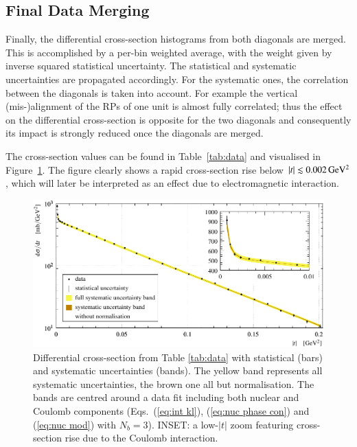 \subsection{Final Data Merging}
\label{sec:final data merging}

Finally, the differential cross-section histograms from both diagonals are merged. This is accomplished by a per-bin weighted average, with the weight given by inverse squared statistical uncertainty. The statistical and systematic uncertainties are propagated accordingly. For the systematic ones, the correlation between the diagonals is taken into account. For example the vertical (mis-)alignment of the RPs of one unit is almost fully correlated; thus the effect on the differential cross-section is opposite for the two diagonals and consequently its impact is strongly reduced once the diagonals are merged.

The cross-section values can be found in Table~\ref{tab:data} and visualised in Figure~\ref{fig:dsdt}. The figure clearly shows a rapid cross-section rise below $|t| \lesssim 0.002\,{\rm GeV^2}$, which will later be interpreted as an effect due to electromagnetic interaction.



\begin{figure}
\vskip-5mm
\begin{center}
\includegraphics{fig/t_dist_tabulation.pdf}
\vskip-3mm
\caption{%
Differential cross-section from Table \ref{tab:data} with statistical (bars) and systematic uncertainties (bands). The yellow band represents all systematic uncertainties, the brown one all but normalisation. The bands are centred around a data fit including both nuclear and Coulomb components (Eqs.~(\ref{eq:int kl}), (\ref{eq:nuc phase con}) and (\ref{eq:nuc mod}) with $N_b=3$). INSET: a low-$|t|$ zoom featuring cross-section rise due to the Coulomb interaction.
}
\label{fig:dsdt}
\end{center}
\end{figure}

